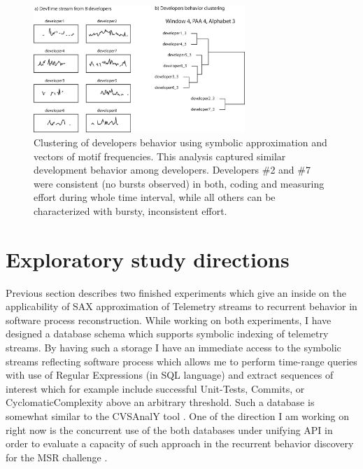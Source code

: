 \documentclass{sig-alternate}
\begin{document}
\begin{figure}[tbp]
   \centering
   \includegraphics[height=48mm]{dev_clustering.eps}
   \caption{Clustering of developers behavior using symbolic approximation and vectors of motif frequencies. This analysis captured similar development behavior among developers. Developers \#2 and \#7 were consistent (no bursts observed) in both, coding and measuring effort during whole time interval, while all others can be characterized with bursty, inconsistent effort.}
   \label{fig:cluster_developers}
\end{figure}

\section{Exploratory study directions}
Previous section describes two finished experiments which give an inside on the applicability of SAX approximation of Telemetry streams to recurrent behavior in software process reconstruction. While working on both experiments, I have designed a database schema which supports symbolic indexing of telemetry streams. By having such a storage I have an immediate access to the symbolic streams reflecting software process which allows me to perform time-range queries with use of Regular Expressions (in SQL language) and extract sequences of interest which for example include successful Unit-Tests, Commits, or CyclomaticComplexity above an arbitrary threshold. Such a database is somewhat similar to the CVSAnalY tool \cite{citeulike:6544724}. One of the direction I am working on right now is the concurrent use of the both databases under unifying API in order to evaluate a capacity of such approach in the recurrent behavior discovery for the MSR challenge \cite{citeulike:5043676}.
\end{document}
